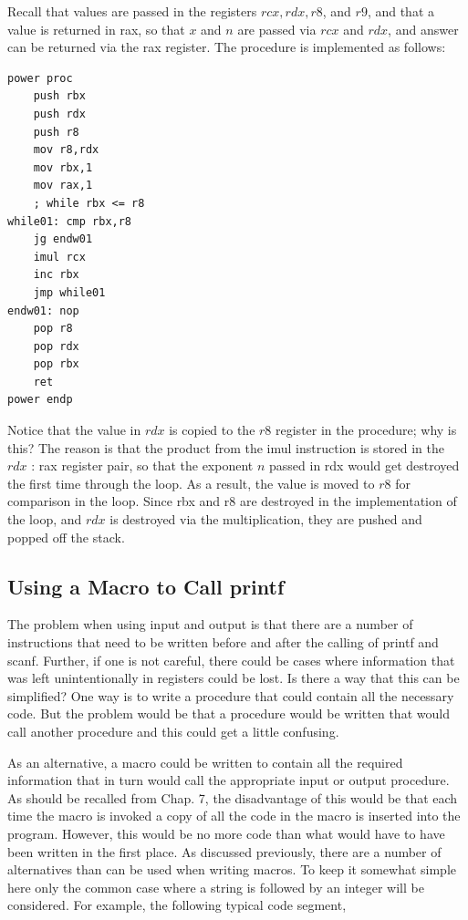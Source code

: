 \documentclass[10pt]{book}
\begin{document}
Recall that values are passed in the registers $r c x, r d x, r 8$, and $r 9$, and that a value is returned in rax, so that $x$ and $n$ are passed via $r c x$ and $r d x$, and answer can be returned via the rax register. The procedure is implemented as follows:

\begin{verbatim}
power proc
    push rbx
    push rdx
    push r8
    mov r8,rdx
    mov rbx,1
    mov rax,1
    ; while rbx <= r8
while01: cmp rbx,r8
    jg endw01
    imul rcx
    inc rbx
    jmp while01
endw01: nop
    pop r8
    pop rdx
    pop rbx
    ret
power endp
\end{verbatim}

Notice that the value in $r d x$ is copied to the $r 8$ register in the procedure; why is this? The reason is that the product from the imul instruction is stored in the $r d x$ : rax register pair, so that the exponent $n$ passed in rdx would get destroyed the first time through the loop. As a result, the value is moved to $r 8$ for comparison in the loop. Since rbx and r8 are destroyed in the implementation of the loop, and $r d x$ is destroyed via the multiplication, they are pushed and popped off the stack.

\subsection{Using a Macro to Call printf}
The problem when using input and output is that there are a number of instructions that need to be written before and after the calling of printf and scanf. Further, if one is not careful, there could be cases where information that was left unintentionally in registers could be lost. Is there a way that this can be simplified? One way is to write a procedure that could contain all the necessary code. But the problem would be that a procedure would be written that would call another procedure and this could get a little confusing.

As an alternative, a macro could be written to contain all the required information that in turn would call the appropriate input or output procedure. As should be recalled from Chap. 7, the disadvantage of this would be that each time the macro is invoked a copy of all the code in the macro is inserted into the program. However, this would be no more code than what would have to have been written in the first place. As discussed previously, there are a number of alternatives than can be used when writing macros. To keep it somewhat simple here only the common case where a string is followed by an integer will be considered. For example, the following typical code segment,
\end{document}

